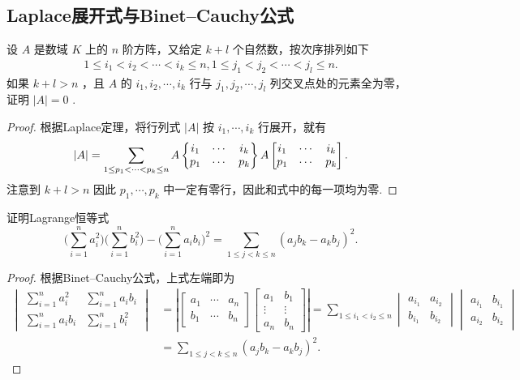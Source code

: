 \subsection{Laplace展开式与Binet--Cauchy公式}
\begin{prob}[3]
	设 $A$ 是数域 $K$ 上的 $n$ 阶方阵，又给定 $k+l$ 个自然数，按次序排列如下
	\begin{align*}
		1\le i_1<i_2<\cdots<i_k\le n,
		1\le j_1<j_2<\cdots<j_l\le n.
	\end{align*}
	如果 $k+l>n$ ，且 $A$ 的 $i_1,i_2,\cdots,i_k$ 行与 $j_1,j_2,\cdots,j_l$ 列交叉点处的元素全为零，证明 $|A|=0$ .
\end{prob}
\begin{proof}
	根据Laplace定理，将行列式 $|A|$ 按 $i_1,\cdots,i_k$ 行展开，就有
	\[
		|A|=\sum_{1\le p_1<\cdots<p_k\le n}A\left\{\begin{array}{@{}ccc@{}}
			i_1 & \cdots & i_k \\
			p_1 & \cdots & p_k
		\end{array}\right\}A\left[\begin{array}{@{}ccc@{}}
				i_1 & \cdots & i_k \\
				p_1 & \cdots & p_k
			\end{array}\right].
	\]
	注意到 $k+l>n$ 因此 $p_1,\cdots,p_k$ 中一定有零行，因此和式中的每一项均为零.
\end{proof}
\begin{prob}[5]
	证明Lagrange恒等式
	\[
		\biggl(\sum_{i=1}^{n}a_i^2\biggr)\biggl(\sum_{i=1}^{n}b_i^2\biggr)-\biggl(\sum_{i=1}^{n}a_ib_i\biggr)^2=\sum_{1\le j<k\le n}(a_jb_k-a_kb_j)^2.
	\]
\end{prob}
\begin{proof}
	根据Binet--Cauchy公式，上式左端即为
	\begin{align*}
		\begin{vmatrix}
			\displaystyle \sum_{i=1}^{n}a_i^2  & \displaystyle \sum_{i=1}^{n}a_ib_i \\
			\displaystyle \sum_{i=1}^{n}a_ib_i & \displaystyle \sum_{i=1}^{n}b_i^2
		\end{vmatrix} & =\left|\begin{bmatrix}
			a_1 & \cdots & a_n \\
			b_1 & \cdots & b_n
		\end{bmatrix}\begin{bmatrix}
			a_1    & b_1    \\
			\vdots & \vdots \\
			a_n    & b_n
		\end{bmatrix}\right|=\sum_{1\le i_1<i_2\le n}\begin{vmatrix}
			a_{i_1} & a_{i_2} \\
			b_{i_1} & b_{i_2}
		\end{vmatrix}\begin{vmatrix}
			a_{i_1} & b_{i_1} \\
			a_{i_2} & b_{i_2}
		\end{vmatrix} \\
		                           & =\sum_{1\le j<k\le n}(a_jb_k-a_kb_j)^2.
	\end{align*}
\end{proof}
